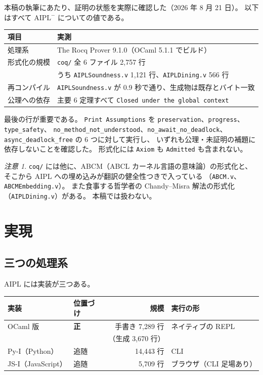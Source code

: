 \documentclass[11pt,a4paper]{ltjsarticle}
\theoremstyle{definition}
\theoremstyle{remark}
\newtheorem{remark}[theorem]{注意}
\begin{document}
本稿の執筆にあたり、証明の状態を実際に確認した（2026 年 8 月 21 日）。
以下はすべて $\mathrm{AIPL}^{-}$ についての値である。

\begin{center}
\begin{tabular}{ll}
\toprule
項目 & 実測 \\
\midrule
処理系 & The Rocq Prover 9.1.0（OCaml 5.1.1 でビルド） \\
形式化の規模 & \texttt{coq/} 全 6 ファイル 2,757 行 \\
 & うち \texttt{AIPLSoundness.v} 1,121 行、\texttt{AIPLDining.v} 566 行 \\
再コンパイル & \texttt{AIPLSoundness.v} が 0.9 秒で通り、生成物は既存とバイト一致 \\
公理への依存 & 主要 6 定理すべて \texttt{Closed under the global context} \\
\bottomrule
\end{tabular}
\end{center}

最後の行が重要である。
\texttt{Print Assumptions} を
\texttt{preservation}、\texttt{progress}、\texttt{type\_safety}、
\texttt{no\_method\_not\_understood}、\texttt{no\_await\_no\_deadlock}、
\texttt{async\_deadlock\_free} の 6 つに対して実行し、
いずれも公理・未証明の補題に依存しないことを確認した。
形式化には \texttt{Axiom} も \texttt{Admitted} も含まれない。

\begin{remark}
\texttt{coq/} には他に、ABCM（ABCL カーネル言語の意味論）の形式化と、
そこから AIPL への埋め込みが翻訳の健全性つきで入っている
（\texttt{ABCM.v}、\texttt{ABCMEmbedding.v}）。
また食事する哲学者の Chandy--Misra 解法の形式化（\texttt{AIPLDining.v}）がある。
本稿では扱わない。
\end{remark}

\section{実現}
\label{sec:impl}

\subsection{三つの処理系}

AIPL には実装が三つある。

\begin{center}
\begin{tabular}{llrl}
\toprule
実装 & 位置づけ & 規模 & 実行の形 \\
\midrule
OCaml 版 & \textbf{正} & 手書き 7,289 行 & ネイティブの REPL \\
         &            & （生成 3,670 行） & \\
Py-I（Python） & 追随 & 14,443 行 & CLI \\
JS-I（JavaScript） & 追随 & 5,709 行 & ブラウザ（CLI 足場あり） \\
\bottomrule
\end{tabular}
\end{center}
\end{document}
